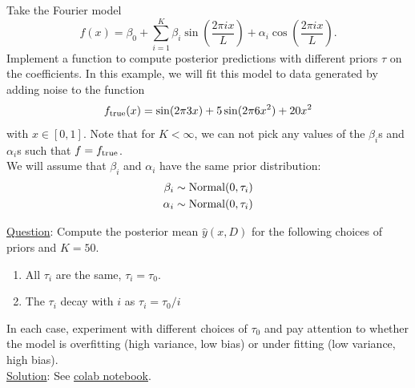 \begin{example}\label{ex:fourier regularization}
Take the Fourier model
\begin{equation*}
f(x) =\beta_0 +  \sum_{i=1}^K\beta_i \sin\left(\frac{2\pi i x}{L} \right) + \alpha_i \cos\left(\frac{2\pi i x}{L} \right).
\end{equation*}
Implement a function to compute posterior predictions with different priors $\tau$ on the coefficients. In this example, we will fit this model to data generated by adding noise to the function 
\begin{equation*}
f_{\rm true}(x) = \sin(2\pi 3x) + 5\sin(2\pi 6x^2) + 20x^2
\end{equation*}
with $x \in [0,1]$.
Note that for $K<\infty$, we can not pick any values of the $\beta_i$s and $\alpha_i$s such that $f = f_{\rm true}$.  \\ 

We will assume that $\beta_i$ and $\alpha_i$ have the same prior distribution: 
\begin{align*}
\beta_i \sim {\rm Normal}(0,\tau_i)\\
\alpha_i \sim {\rm Normal}(0,\tau_i)\\
\end{align*}

\noindent 
\underline{Question}: 
Compute the posterior mean $\hat{y}(x,D)$ for the following choices of priors and $K=50$. 
\begin{enumerate}[label=(\alph*)]
\item All $\tau_i$ are the same, $\tau_i = \tau_0$. 
\item The $\tau_i$ decay with $i$ as $\tau_i = \tau_0/i$
\end{enumerate}
In each case, experiment with different choices of $\tau_0$ and pay attention to whether the model is overfitting (high variance, low bias) or under fitting (low variance, high bias). \\


\noindent 
\underline{Solution}: See  \href{https://colab.research.google.com/drive/1sFlY0nvo7hrsNYGRdx8C4tKPihyOSmbx?usp=sharing}{colab notebook}. 


 
\end{example}




